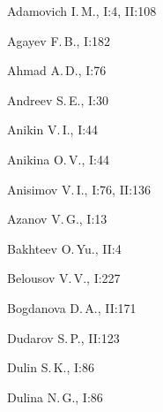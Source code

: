 \renewcommand{\indexname}{\ }








\begin{theindex}







  \item Adamovich I.\,M., I:4, II:108


  \item Agayev F.\,B., I:182


  \item Ahmad A.\,D., I:76


  \item Andreev S.\,E., I:30


  \item Anikin V.\,I., I:44


  \item Anikina O.\,V., I:44


  \item Anisimov V.\,I., I:76, II:136


  \item Azanov V.\,G., I:13





  \indexspace





  \item Bakhteev O.\,Yu., II:4


  \item Belousov V.\,V., I:227


  \item Bogdanova D.\,A., II:171





  \indexspace





  \item Dudarov S.\,P., II:123


  \item Dulin S.\,K., I:86


  \item Dulina N.\,G., I:86





  \indexspace






\end{theindex}
